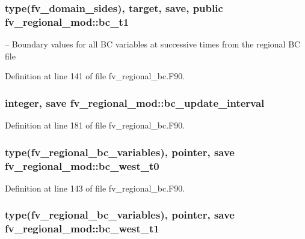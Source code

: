\subsubsection[{bc\-\_\-t1}]{\setlength{\rightskip}{0pt plus 5cm}type({\bf fv\-\_\-domain\-\_\-sides}), target, save, public fv\-\_\-regional\-\_\-mod\-::bc\-\_\-t1}\label{classfv__regional__mod_acac95ec214236b8e748460a0132f03bc}


-- Boundary values for all B\-C variables at successive times from the regional B\-C file 



Definition at line 141 of file fv\-\_\-regional\-\_\-bc.\-F90.

\subsubsection[{bc\-\_\-update\-\_\-interval}]{\setlength{\rightskip}{0pt plus 5cm}integer, save fv\-\_\-regional\-\_\-mod\-::bc\-\_\-update\-\_\-interval\hspace{0.3cm}{\ttfamily [private]}}\label{classfv__regional__mod_aa8a82e411bb80aa539a1f5ff6436fdc1}


Definition at line 181 of file fv\-\_\-regional\-\_\-bc.\-F90.

\subsubsection[{bc\-\_\-west\-\_\-t0}]{\setlength{\rightskip}{0pt plus 5cm}type({\bf fv\-\_\-regional\-\_\-bc\-\_\-variables}), pointer, save fv\-\_\-regional\-\_\-mod\-::bc\-\_\-west\-\_\-t0\hspace{0.3cm}{\ttfamily [private]}}\label{classfv__regional__mod_aad83e1ac00233cc47374f4b3cf630a1d}


Definition at line 143 of file fv\-\_\-regional\-\_\-bc.\-F90.

\subsubsection[{bc\-\_\-west\-\_\-t1}]{\setlength{\rightskip}{0pt plus 5cm}type({\bf fv\-\_\-regional\-\_\-bc\-\_\-variables}), pointer, save fv\-\_\-regional\-\_\-mod\-::bc\-\_\-west\-\_\-t1\hspace{0.3cm}{\ttfamily [private]}}\label{classfv__regional__mod_aa8aceea599c16392ae3ebc4b65668992}


